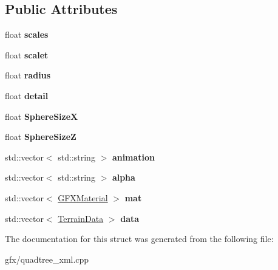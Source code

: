 \subsection*{Public Attributes}
\begin{DoxyCompactItemize}
\item 
float {\bfseries scales}\hypertarget{structTerraXML_a96bd6bf3b0835507336767eb3e78f945}{}\label{structTerraXML_a96bd6bf3b0835507336767eb3e78f945}

\item 
float {\bfseries scalet}\hypertarget{structTerraXML_ad8943a3c6ea5b98002f3c71b970ccebb}{}\label{structTerraXML_ad8943a3c6ea5b98002f3c71b970ccebb}

\item 
float {\bfseries radius}\hypertarget{structTerraXML_a285d3b511453184afcc7ab6aed4cc8a4}{}\label{structTerraXML_a285d3b511453184afcc7ab6aed4cc8a4}

\item 
float {\bfseries detail}\hypertarget{structTerraXML_afd376c5e5e7921f7e7bb663050fa0494}{}\label{structTerraXML_afd376c5e5e7921f7e7bb663050fa0494}

\item 
float {\bfseries Sphere\+SizeX}\hypertarget{structTerraXML_abc1a0b5c961dc2d0e6f3e7be27cbba20}{}\label{structTerraXML_abc1a0b5c961dc2d0e6f3e7be27cbba20}

\item 
float {\bfseries Sphere\+SizeZ}\hypertarget{structTerraXML_adc14c979ae41400007635a5171ebfb61}{}\label{structTerraXML_adc14c979ae41400007635a5171ebfb61}

\item 
std\+::vector$<$ std\+::string $>$ {\bfseries animation}\hypertarget{structTerraXML_a8f293f9c9d34aa3af15371805483b91b}{}\label{structTerraXML_a8f293f9c9d34aa3af15371805483b91b}

\item 
std\+::vector$<$ std\+::string $>$ {\bfseries alpha}\hypertarget{structTerraXML_ab794f0a5451a31880500985a7be0d3c3}{}\label{structTerraXML_ab794f0a5451a31880500985a7be0d3c3}

\item 
std\+::vector$<$ \hyperlink{structGFXMaterial}{G\+F\+X\+Material} $>$ {\bfseries mat}\hypertarget{structTerraXML_a7eeda60194ee9c581e9ebc8a118ed33f}{}\label{structTerraXML_a7eeda60194ee9c581e9ebc8a118ed33f}

\item 
std\+::vector$<$ \hyperlink{structTerrainData}{Terrain\+Data} $>$ {\bfseries data}\hypertarget{structTerraXML_a1de82cfa138da1d42c84d6062a09a345}{}\label{structTerraXML_a1de82cfa138da1d42c84d6062a09a345}

\end{DoxyCompactItemize}


The documentation for this struct was generated from the following file\+:\begin{DoxyCompactItemize}
\item 
gfx/quadtree\+\_\+xml.\+cpp\end{DoxyCompactItemize}
